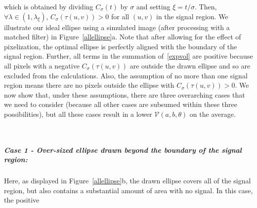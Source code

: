 \documentclass[12pt]{article}
\newcommand{\mV}{\mathcal V}
\begin{document}
which is obtained by dividing $C_\sigma(t)$ by $\sigma$ and setting
$\xi=t/\sigma$. 
Then, $\forall\lambda \in (1, \lambda_\xi)$, 
$C_\sigma(\tau(u,v)) > 0 $  for all $(u,v)$ in the signal
region. We illustrate our ideal ellipse using a
simulated image (after processing with
a matched filter) in Figure~\ref{allellipse}a. Note that
after allowing for the effect of pixelization, the optimal
ellipse is perfectly aligned with the boundary of the signal
region. Further, all terms in the
summation of~\eqref{expvol} are positive because all pixels with a
negative $C_\sigma(\tau(u,v))$ are outside the drawn ellipse and so
are excluded from the calculations. Also, the assumption
of no more than one signal region means there are no 
pixels outside the ellipse with 
$C_\sigma(\tau(u,v))>0$. We now show that, under these assumptions,
there are three overarching cases that we need   to consider (because all
other cases are 
subsumed within these three possibilities), but all these cases result
in a lower $\mV(a,b,\theta)$ on the average. %
\begin{figure*}[htbp]
\vspace{-0.05in}
\mbox{
}
\vspace{-0.1in}
\caption{(a) Sample elliptical signal region with drawn optimal ellipse matching
      the boundaries. (b) Over-sized, (c) under-sized and (d)
      misaligned ellipses that demonstrate the possibilities that
      justify the development of the specific $\mV(a,b,\theta)$ of
  Section~\ref{optimalelliptical}.} 
\label{allellipse}
\vspace{-0.15in}
\end{figure*}
\subparagraph{Case 1 - Over-sized ellipse drawn beyond the boundary
  of the signal region:} Here, as displayed in Figure~\ref{allellipse}b, the 
drawn ellipse covers all of the signal region, but also contains  a
substantial amount of area with no signal. In this case, the positive
\end{document}
